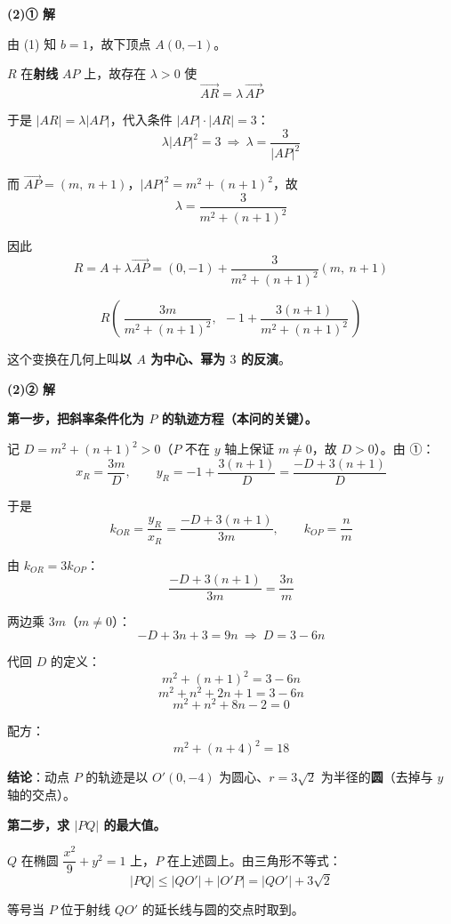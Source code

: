 \par\medskip

\textbf{(2)① 解}

由 (1) 知 $b=1$，故下顶点 $A(0,-1)$。

$R$ 在\textbf{射线} $AP$ 上，故存在 $\lambda>0$ 使
\[\overrightarrow{AR}=\lambda\,\overrightarrow{AP}\]

于是 $|AR|=\lambda|AP|$，代入条件 $|AP|\cdot|AR|=3$：
\[\lambda\left|AP\right|^2=3\ \Longrightarrow\ \lambda=\frac{3}{\left|AP\right|^2}\]

而 $\overrightarrow{AP}=(m,\ n+1)$，$\left|AP\right|^2=m^2+(n+1)^2$，故
\[\lambda=\frac{3}{m^2+(n+1)^2}\]

因此
\[R=A+\lambda\overrightarrow{AP}=\left(0,-1\right)+\frac{3}{m^2+(n+1)^2}\left(m,\ n+1\right)\]

\[\boxed{R\left(\ \frac{3m}{m^2+(n+1)^2},\ \ -1+\frac{3(n+1)}{m^2+(n+1)^2}\ \right)}\]

\begin{gktip}
这个变换在几何上叫\textbf{以 $A$ 为中心、幂为 $3$ 的反演}。
\end{gktip}

\par\medskip

\textbf{(2)② 解}

\textbf{第一步，把斜率条件化为 $P$ 的轨迹方程（本问的关键）。}

记 $D=m^2+(n+1)^2>0$（$P$ 不在 $y$ 轴上保证 $m\ne0$，故 $D>0$）。由 ①：
\[x_R=\frac{3m}{D},\qquad y_R=-1+\frac{3(n+1)}{D}=\frac{-D+3(n+1)}{D}\]

于是
\[k_{OR}=\frac{y_R}{x_R}=\frac{-D+3(n+1)}{3m},\qquad k_{OP}=\frac nm\]

由 $k_{OR}=3k_{OP}$：
\[\frac{-D+3(n+1)}{3m}=\frac{3n}{m}\]

两边乘 $3m$（$m\ne0$）：
\[-D+3n+3=9n\ \Longrightarrow\ D=3-6n\]

代回 $D$ 的定义：
\[m^2+(n+1)^2=3-6n\]
\[m^2+n^2+2n+1=3-6n\]
\[m^2+n^2+8n-2=0\]

配方：
\[m^2+(n+4)^2=18\]

\textbf{结论}：动点 $P$ 的轨迹是以 $O'(0,-4)$ 为圆心、$r=3\sqrt2$ 为半径的\textbf{圆}（去掉与 $y$ 轴的交点）。

\textbf{第二步，求 $|PQ|$ 的最大值。}

$Q$ 在椭圆 $\dfrac{x^2}{9}+y^2=1$ 上，$P$ 在上述圆上。由三角形不等式：
\[|PQ|\le|QO'|+|O'P|=|QO'|+3\sqrt2\]

等号当 $P$ 位于射线 $QO'$ 的延长线与圆的交点时取到。

